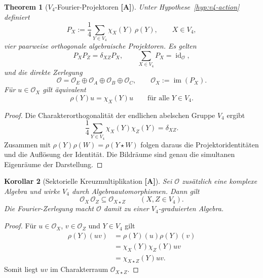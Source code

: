 \documentclass[11pt,a4paper,reqno]{amsart}
\newtheorem{theorem}{Theorem}[section]
\newtheorem{corollary}[theorem]{Korollar}
\theoremstyle{definition}
\theoremstyle{remark}
\newcommand{\im}{\operatorname{im}}
\newcommand{\id}{\operatorname{id}}
\newcommand{\Oh}{\mathcal{O}}
\newcommand{\StatusA}{\textnormal{\textbf{[A]}}}
\begin{document}
\begin{theorem}[$V_4$-Fourier-Projektoren \StatusA]
\label{thm:fourier}
Unter Hypothese~\ref{hyp:v4-action} definiert
\begin{equation}
P_X
:=
\frac{1}{4}\sum_{Y\in V_4}\chi_X(Y)\,\rho(Y),
\qquad X\in V_4,
\end{equation}
vier paarweise orthogonale algebraische Projektoren. Es gelten
\begin{equation}
P_XP_Z=\delta_{XZ}P_X,
\qquad
\sum_{X\in V_4}P_X=\id_{\Oh},
\end{equation}
und die direkte Zerlegung
\begin{equation}
\Oh
=
\Oh_E\oplus\Oh_A\oplus\Oh_B\oplus\Oh_C,
\qquad
\Oh_X:=\im(P_X).
\end{equation}
Für $u\in\Oh_X$ gilt äquivalent
\begin{equation}
\rho(Y)u=\chi_X(Y)u
\qquad\text{für alle }Y\in V_4.
\end{equation}
\end{theorem}

\begin{proof}
Die Charakterorthogonalität der endlichen abelschen Gruppe $V_4$ ergibt
\begin{equation}
\frac{1}{4}\sum_{Y\in V_4}\chi_X(Y)\chi_Z(Y)
=\delta_{XZ}.
\end{equation}
Zusammen mit $\rho(Y)\rho(W)=\rho(Y\star W)$ folgen daraus die Projektoridentitäten und die Auflösung der Identität. Die Bildräume sind genau die simultanen Eigenräume der Darstellung.
\end{proof}

\begin{corollary}[Sektorielle Kreuzmultiplikation \StatusA]
\label{cor:sector-product}
Sei $\Oh$ zusätzlich eine komplexe Algebra und wirke $V_4$ durch Algebraautomorphismen. Dann gilt
\begin{equation}
\boxed{
\Oh_X\,\Oh_Z\subseteq\Oh_{X\star Z}
\qquad (X,Z\in V_4).
}
\end{equation}
Die Fourier-Zerlegung macht $\Oh$ damit zu einer $V_4$-graduierten Algebra.
\end{corollary}

\begin{proof}
Für $u\in\Oh_X$, $v\in\Oh_Z$ und $Y\in V_4$ gilt
\begin{align}
\rho(Y)(uv)
&=\rho(Y)(u)\rho(Y)(v)\\
&=\chi_X(Y)\chi_Z(Y)uv\\
&=\chi_{X\star Z}(Y)uv.
\end{align}
Somit liegt $uv$ im Charakterraum $\Oh_{X\star Z}$.
\end{proof}
\end{document}
